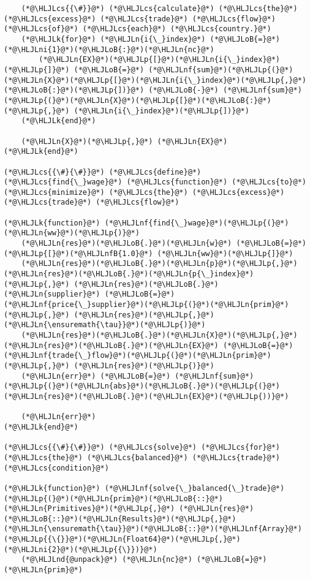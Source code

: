 \documentclass[12pt,a4paper]{article}
\newcommand{\HLJLk}[1]{\textcolor[RGB]{148,91,176}{\textbf{#1}}}
\newcommand{\HLJLn}[1]{#1}
\newcommand{\HLJLnd}[1]{\textcolor[RGB]{214,102,97}{#1}}
\newcommand{\HLJLnf}[1]{\textcolor[RGB]{66,102,213}{#1}}
\newcommand{\HLJLnfB}[1]{\textcolor[RGB]{59,151,46}{#1}}
\newcommand{\HLJLni}[1]{\textcolor[RGB]{59,151,46}{#1}}
\newcommand{\HLJLoB}[1]{\textcolor[RGB]{102,102,102}{\textbf{#1}}}
\newcommand{\HLJLp}[1]{#1}
\newcommand{\HLJLcs}[1]{\textcolor[RGB]{153,153,119}{\textit{#1}}}
\begin{document}
\begin{lstlisting}
    (*@\HLJLcs{{\#}}@*) (*@\HLJLcs{calculate}@*) (*@\HLJLcs{the}@*) (*@\HLJLcs{excess}@*) (*@\HLJLcs{trade}@*) (*@\HLJLcs{flow}@*) (*@\HLJLcs{of}@*) (*@\HLJLcs{each}@*) (*@\HLJLcs{country.}@*)
    (*@\HLJLk{for}@*) (*@\HLJLn{i{\_}index}@*) (*@\HLJLoB{=}@*) (*@\HLJLni{1}@*)(*@\HLJLoB{:}@*)(*@\HLJLn{nc}@*)
        (*@\HLJLn{EX}@*)(*@\HLJLp{[}@*)(*@\HLJLn{i{\_}index}@*)(*@\HLJLp{]}@*) (*@\HLJLoB{=}@*) (*@\HLJLnf{sum}@*)(*@\HLJLp{(}@*)(*@\HLJLn{X}@*)(*@\HLJLp{[}@*)(*@\HLJLn{i{\_}index}@*)(*@\HLJLp{,}@*) (*@\HLJLoB{:}@*)(*@\HLJLp{])}@*) (*@\HLJLoB{-}@*) (*@\HLJLnf{sum}@*)(*@\HLJLp{(}@*)(*@\HLJLn{X}@*)(*@\HLJLp{[}@*)(*@\HLJLoB{:}@*)(*@\HLJLp{,}@*) (*@\HLJLn{i{\_}index}@*)(*@\HLJLp{])}@*)
    (*@\HLJLk{end}@*)

    (*@\HLJLn{X}@*)(*@\HLJLp{,}@*) (*@\HLJLn{EX}@*)
(*@\HLJLk{end}@*)

(*@\HLJLcs{{\#}{\#}}@*) (*@\HLJLcs{define}@*) (*@\HLJLcs{find{\_}wage}@*) (*@\HLJLcs{function}@*) (*@\HLJLcs{to}@*) (*@\HLJLcs{minimize}@*) (*@\HLJLcs{the}@*) (*@\HLJLcs{excess}@*) (*@\HLJLcs{trade}@*) (*@\HLJLcs{flow}@*)

(*@\HLJLk{function}@*) (*@\HLJLnf{find{\_}wage}@*)(*@\HLJLp{(}@*)(*@\HLJLn{ww}@*)(*@\HLJLp{)}@*)
    (*@\HLJLn{res}@*)(*@\HLJLoB{.}@*)(*@\HLJLn{w}@*) (*@\HLJLoB{=}@*) (*@\HLJLp{[}@*)(*@\HLJLnfB{1.0}@*) (*@\HLJLn{ww}@*)(*@\HLJLp{]}@*)
    (*@\HLJLn{res}@*)(*@\HLJLoB{.}@*)(*@\HLJLn{p}@*)(*@\HLJLp{,}@*) (*@\HLJLn{res}@*)(*@\HLJLoB{.}@*)(*@\HLJLn{p{\_}index}@*)(*@\HLJLp{,}@*) (*@\HLJLn{res}@*)(*@\HLJLoB{.}@*)(*@\HLJLn{supplier}@*) (*@\HLJLoB{=}@*) (*@\HLJLnf{price{\_}supplier}@*)(*@\HLJLp{(}@*)(*@\HLJLn{prim}@*)(*@\HLJLp{,}@*) (*@\HLJLn{res}@*)(*@\HLJLp{,}@*) (*@\HLJLn{\ensuremath{\tau}}@*)(*@\HLJLp{)}@*)
    (*@\HLJLn{res}@*)(*@\HLJLoB{.}@*)(*@\HLJLn{X}@*)(*@\HLJLp{,}@*) (*@\HLJLn{res}@*)(*@\HLJLoB{.}@*)(*@\HLJLn{EX}@*) (*@\HLJLoB{=}@*) (*@\HLJLnf{trade{\_}flow}@*)(*@\HLJLp{(}@*)(*@\HLJLn{prim}@*)(*@\HLJLp{,}@*) (*@\HLJLn{res}@*)(*@\HLJLp{)}@*)
    (*@\HLJLn{err}@*) (*@\HLJLoB{=}@*) (*@\HLJLnf{sum}@*)(*@\HLJLp{(}@*)(*@\HLJLn{abs}@*)(*@\HLJLoB{.}@*)(*@\HLJLp{(}@*)(*@\HLJLn{res}@*)(*@\HLJLoB{.}@*)(*@\HLJLn{EX}@*)(*@\HLJLp{))}@*)

    (*@\HLJLn{err}@*)
(*@\HLJLk{end}@*)

(*@\HLJLcs{{\#}{\#}}@*) (*@\HLJLcs{solve}@*) (*@\HLJLcs{for}@*) (*@\HLJLcs{the}@*) (*@\HLJLcs{balanced}@*) (*@\HLJLcs{trade}@*) (*@\HLJLcs{condition}@*)

(*@\HLJLk{function}@*) (*@\HLJLnf{solve{\_}balanced{\_}trade}@*)(*@\HLJLp{(}@*)(*@\HLJLn{prim}@*)(*@\HLJLoB{::}@*)(*@\HLJLn{Primitives}@*)(*@\HLJLp{,}@*) (*@\HLJLn{res}@*)(*@\HLJLoB{::}@*)(*@\HLJLn{Results}@*)(*@\HLJLp{,}@*) (*@\HLJLn{\ensuremath{\tau}}@*)(*@\HLJLoB{::}@*)(*@\HLJLnf{Array}@*)(*@\HLJLp{{\{}}@*)(*@\HLJLn{Float64}@*)(*@\HLJLp{,}@*) (*@\HLJLni{2}@*)(*@\HLJLp{{\}})}@*)
    (*@\HLJLnd{@unpack}@*) (*@\HLJLn{nc}@*) (*@\HLJLoB{=}@*) (*@\HLJLn{prim}@*)


\end{lstlisting}
\end{document}
